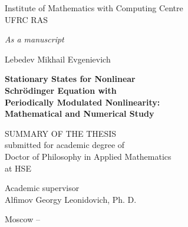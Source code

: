 \documentclass[candidate, href, colorlinks]{disser}
\begin{document}
\begin{titlepage}
\thispagestyle{empty}
\enlargethispage{1cm}
\vspace*{-2cm}

\begin{center}
	Institute of Mathematics with Computing Centre \\ UFRC RAS
\end{center}

\vskip1cm
	
\begin{flushright}
	\emph{As a manuscript}
\end{flushright}
	
\vskip3cm

\begin{center}
	{\large Lebedev Mikhail Evgenievich}
	\vskip1cm
	{\Large\bfseries Stationary States for Nonlinear \\ Schr\"odinger Equation with \\ Periodically Modulated Nonlinearity: \\ Mathematical and Numerical Study\par}
	\vskip1.5cm
	{SUMMARY OF THE THESIS \\ submitted for academic degree of \\ Doctor of Philosophy in Applied Mathematics \\ at HSE}
\end{center}

\vskip2cm

\hspace{8cm}\begin{minipage}{0.45\linewidth}
	Academic supervisor \\
	Alfimov Georgy Leonidovich, Ph. D.
\end{minipage}

\vfill

\begin{center}
	{Moscow -- \the\year}
\end{center}

\normalfont\clearpage
\end{titlepage}
\end{document}
